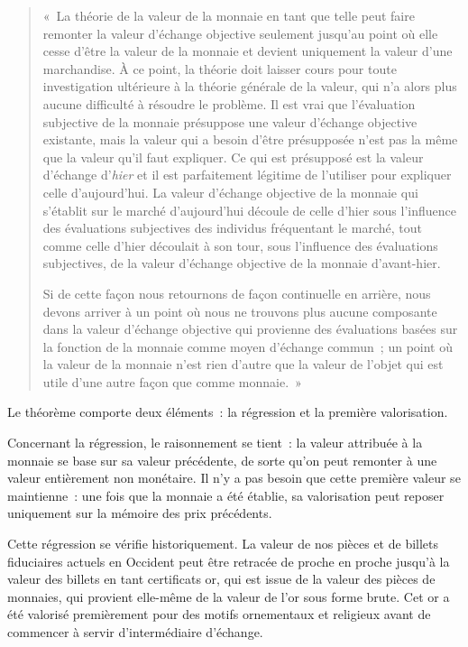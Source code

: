 \begin{quote}
«~La théorie de la valeur de la monnaie en tant que telle peut faire remonter la valeur d'échange objective seulement jusqu'au point où elle cesse d'être la valeur de la monnaie et devient uniquement la valeur d'une marchandise. À ce point, la théorie doit laisser cours pour toute investigation ultérieure à la théorie générale de la valeur, qui n'a alors plus aucune difficulté à résoudre le problème. Il est vrai que l'évaluation subjective de la monnaie présuppose une valeur d'échange objective existante, mais la valeur qui a besoin d'être présupposée n'est pas la même que la valeur qu'il faut expliquer. Ce qui est présupposé est la valeur d'échange d'\emph{hier} et il est parfaitement légitime de l'utiliser pour expliquer celle d'aujourd'hui. La valeur d'échange objective de la monnaie qui s'établit sur le marché d'aujourd'hui découle de celle d'hier sous l'influence des évaluations subjectives des individus fréquentant le marché, tout comme celle d'hier découlait à son tour, sous l'influence des évaluations subjectives, de la valeur d'échange objective de la monnaie d'avant-hier.

Si de cette façon nous retournons de façon continuelle en arrière, nous devons arriver à un point où nous ne trouvons plus aucune composante dans la valeur d'échange objective qui provienne des évaluations basées sur la fonction de la monnaie comme moyen d'échange commun~; un point où la valeur de la monnaie n'est rien d'autre que la valeur de l'objet qui est utile d'une autre façon que comme monnaie.~» %
\end{quote}
 
Le théorème comporte deux éléments~: la régression et la première valorisation.

Concernant la régression, le raisonnement se tient~: la valeur attribuée à la monnaie se base sur sa valeur précédente, de sorte qu'on peut remonter à une valeur entièrement non monétaire. Il n'y a pas besoin que cette première valeur se maintienne~: une fois que la monnaie a été établie, sa valorisation peut reposer uniquement sur la mémoire des prix précédents. 

Cette régression se vérifie historiquement. La valeur de nos pièces et de billets fiduciaires actuels en Occident peut être retracée de proche en proche jusqu'à la valeur des billets en tant certificats or, qui est issue de la valeur des pièces de monnaies, qui provient elle-même de la valeur de l'or sous forme brute. Cet or a été valorisé premièrement pour des motifs ornementaux et religieux avant de commencer à servir d'intermédiaire d'échange. 

